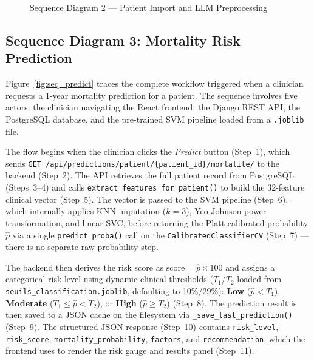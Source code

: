 \documentclass[12pt,a4paper,twoside]{report}
\begin{document}
\begin{figure}[htbp]
{
}
\caption{Sequence Diagram 2 — Patient Import and LLM Preprocessing}
\label{fig:seq_preproc}
\end{figure}

\subsection{Sequence Diagram 3: Mortality Risk Prediction}

Figure~\ref{fig:seq_predict} traces the complete workflow triggered when a clinician requests a 1-year mortality prediction for a patient. The sequence involves five actors: the clinician navigating the React frontend, the Django REST API, the PostgreSQL database, and the pre-trained SVM pipeline loaded from a \texttt{.joblib} file.

The flow begins when the clinician clicks the \textit{Predict} button (Step~1), which sends \texttt{GET /api/predictions/patient/\{patient\_id\}/mortalite/} to the backend (Step~2). The API retrieves the full patient record from PostgreSQL (Steps~3--4) and calls \texttt{extract\_features\_for\_patient()} to build the 32-feature clinical vector (Step~5). The vector is passed to the SVM pipeline (Step~6), which internally applies KNN imputation ($k=3$), Yeo-Johnson power transformation, and linear SVC, before returning the Platt-calibrated probability $\hat{p}$ via a single \texttt{predict\_proba()} call on the \texttt{CalibratedClassifierCV} (Step~7) --- there is no separate raw probability step.

The backend then derives the risk score as $\text{score} = \hat{p} \times 100$ and assigns a categorical risk level using dynamic clinical thresholds ($T_1$/$T_2$ loaded from \texttt{seuils\_classification.joblib}, defaulting to 10\%/29\%): \textbf{Low} ($\hat{p} < T_1$), \textbf{Moderate} ($T_1 \leq \hat{p} < T_2$), or \textbf{High} ($\hat{p} \geq T_2$) (Step~8). The prediction result is then saved to a JSON cache on the filesystem via \texttt{\_save\_last\_prediction()} (Step~9). The structured JSON response (Step~10) contains \texttt{risk\_level}, \texttt{risk\_score}, \texttt{mortality\_probability}, \texttt{factors}, and \texttt{recommendation}, which the frontend uses to render the risk gauge and results panel (Step~11).
\end{document}
